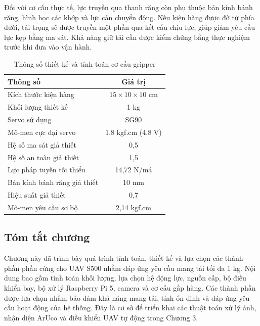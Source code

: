 Đối với cơ cấu thực tế, lực truyền qua
thanh răng còn phụ thuộc bán kính bánh răng,
hình học các khớp và lực cản chuyển động.
Nếu kiện hàng được đỡ từ phía dưới,
tải trọng sẽ được truyền một phần qua kết cấu
chịu lực, giúp giảm yêu cầu lực kẹp bằng ma sát.
Khả năng giữ tải cần được kiểm chứng bằng
thực nghiệm trước khi đưa vào vận hành.

\begin{table}[H]
    \centering
    \caption{Thông số thiết kế và tính toán cơ cấu gripper}
    \label{tab:gripper_parameters}
    \begin{tabular}{|l|c|}
        \hline
        \textbf{Thông số} & \textbf{Giá trị} \\ \hline
        Kích thước kiện hàng
        & $15 \times 10 \times 10$ cm \\ \hline
        Khối lượng thiết kế & 1 kg \\ \hline
        Servo sử dụng & SG90 \\ \hline
        Mô-men cực đại servo
        & 1,8 kgf.cm (4,8 V) \\ \hline
        Hệ số ma sát giả thiết & 0,5 \\ \hline
        Hệ số an toàn giả thiết & 1,5 \\ \hline
        Lực pháp tuyến tối thiểu
        & 14,72 N/má \\ \hline
        Bán kính bánh răng giả thiết
        & 10 mm \\ \hline
        Hiệu suất giả thiết & 0,7 \\ \hline
        Mô-men yêu cầu sơ bộ
        & 2,14 kgf.cm \\ \hline
    \end{tabular}
\end{table}

\subsection{Tóm tắt chương}

Chương này đã trình bày quá trình tính toán, thiết kế và lựa chọn các thành phần phần cứng cho UAV S500 nhằm đáp ứng yêu cầu mang tải tối đa 1 kg. Nội dung bao gồm tính toán khối lượng, lựa chọn hệ động lực, nguồn cấp, bộ điều khiển bay, bộ xử lý Raspberry Pi 5, camera và cơ cấu gắp hàng. Các thành phần được lựa chọn nhằm bảo đảm khả năng mang tải, tính ổn định và đáp ứng yêu cầu hoạt động của hệ thống. Đây là cơ sở để triển khai các thuật toán xử lý ảnh, nhận diện ArUco và điều khiển UAV tự động trong Chương 3.